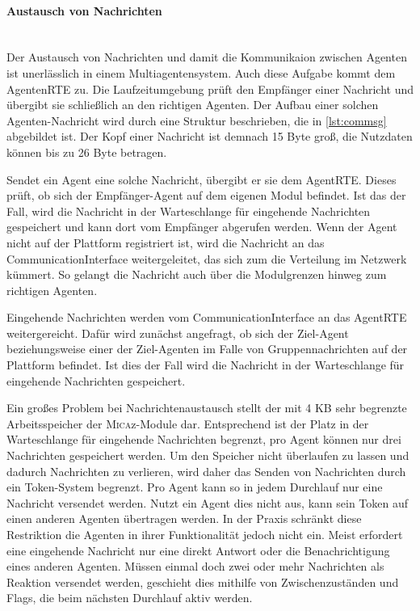 

\paragraph{Austausch von Nachrichten}\mbox{}\\
Der Austausch von Nachrichten und damit die Kommunikaion zwischen Agenten ist unerlässlich in einem Multiagentensystem. Auch diese Aufgabe kommt dem AgentenRTE zu. Die Laufzeitumgebung prüft den Empfänger einer Nachricht und übergibt sie schließlich an den richtigen Agenten. Der Aufbau einer solchen Agenten-Nachricht wird durch eine Struktur beschrieben, die in \autoref{lst:commsg} abgebildet ist. Der Kopf einer Nachricht ist demnach 15 Byte groß, die Nutzdaten können bis zu 26 Byte betragen.



Sendet ein Agent eine solche Nachricht, übergibt er sie dem AgentRTE. Dieses prüft, ob sich der Empfänger-Agent auf dem eigenen Modul befindet. Ist das der Fall, wird die Nachricht in der Warteschlange für eingehende Nachrichten gespeichert und kann dort vom Empfänger abgerufen werden. Wenn der Agent nicht auf der Plattform registriert ist, wird die Nachricht an das CommunicationInterface weitergeleitet, das sich zum die Verteilung im Netzwerk kümmert. So gelangt die Nachricht auch über die Modulgrenzen hinweg zum richtigen Agenten.

Eingehende Nachrichten werden vom CommunicationInterface an das AgentRTE weitergereicht. Dafür wird zunächst angefragt, ob sich der Ziel-Agent beziehungsweise einer der Ziel-Agenten im Falle von Gruppennachrichten auf der Plattform befindet. Ist dies der Fall wird die Nachricht in der Warteschlange für eingehende Nachrichten gespeichert.

Ein großes Problem bei Nachrichtenaustausch stellt der mit 4 KB sehr begrenzte Arbeitsspeicher der \textsc{Mica}z-Module dar. Entsprechend ist der Platz in der Warteschlange für eingehende Nachrichten begrenzt, pro Agent können nur drei Nachrichten gespeichert werden. Um den Speicher nicht überlaufen zu lassen und dadurch Nachrichten zu verlieren, wird daher das Senden von Nachrichten durch ein Token-System begrenzt. Pro Agent kann so in jedem Durchlauf nur eine Nachricht versendet werden. Nutzt ein Agent dies nicht aus, kann sein Token auf einen anderen Agenten übertragen werden. In der Praxis schränkt diese Restriktion die Agenten in ihrer Funktionalität jedoch nicht ein. Meist erfordert eine eingehende Nachricht nur eine direkt Antwort oder die Benachrichtigung eines anderen Agenten. Müssen einmal doch zwei oder mehr Nachrichten als Reaktion versendet werden, geschieht dies mithilfe von Zwischenzuständen und Flags, die beim nächsten Durchlauf aktiv werden.
